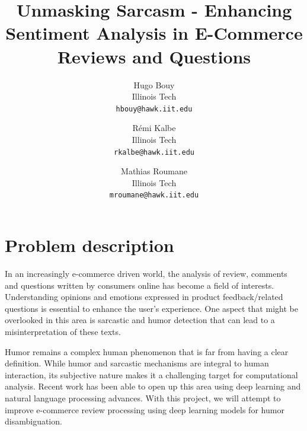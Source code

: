 \documentclass[10pt,twocolumn,letterpaper]{article}
\begin{document}
\title{Unmasking Sarcasm - Enhancing Sentiment Analysis in E-Commerce Reviews and Questions
}

\author{Hugo Bouy\\
Illinois Tech\\
{\tt\small hbouy@hawk.iit.edu}
\and
Rémi Kalbe\\
Illinois Tech\\
{\tt\small rkalbe@hawk.iit.edu}
\and
Mathias Roumane\\
Illinois Tech\\
{\tt\small mroumane@hawk.iit.edu}
}
\maketitle


\section{Problem description}
\label{sec:intro}
In an increasingly e-commerce driven world, the analysis of review, comments and questions written by consumers online has become a field of interests.
Understanding opinions and emotions expressed in product feedback/related questions is essential to enhance the user’s experience.
One aspect that might be overlooked in this area is sarcastic and humor detection that can lead to a misinterpretation of these texts.

Humor remains a complex human phenomenon that is far from having a clear definition.
While humor and sarcastic mechanisms are integral to human interaction, its subjective nature makes it a challenging target for computational analysis.
Recent work has been able to open up this area using deep learning and natural language processing advances.
With this project, we will attempt to improve e-commerce review processing using deep learning models for humor disambiguation.
\end{document}
